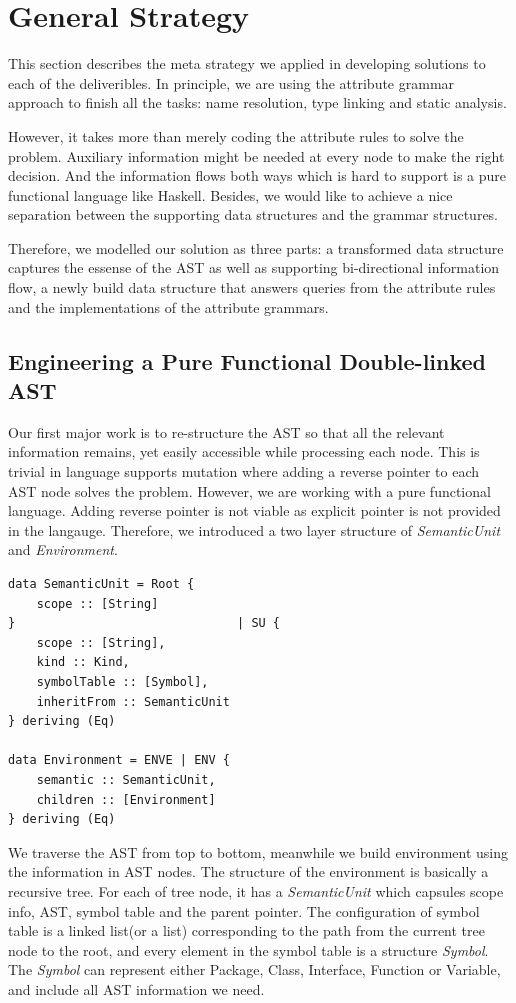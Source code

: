 \documentclass[12pt,letterpaper]{article}
\begin{document}
\section{General Strategy}
This section describes the meta strategy we applied in developing solutions to each of the deliveribles. In principle, we are using the attribute grammar approach to finish all the tasks: name resolution, type linking and static analysis.

However, it takes more than merely coding the attribute rules to solve the problem. Auxiliary information might be needed at every node to make the right decision. And the information flows both ways which is hard to support is a pure functional language like Haskell. Besides, we would like to achieve a nice separation between the supporting data structures and the grammar structures.

Therefore, we modelled our solution as three parts: a transformed data structure captures the essense of the AST as well as supporting bi-directional information flow, a newly build data structure that answers queries from the attribute rules and the implementations of the attribute grammars.

\subsection{Engineering a Pure Functional Double-linked AST}
Our first major work is to re-structure the AST so that all the relevant information remains, yet easily accessible while processing each node. This is trivial in language supports mutation where adding a reverse pointer to each AST node solves the problem. However, we are working with a pure functional language. Adding reverse pointer is not viable as explicit pointer is not provided in the langauge. Therefore, we introduced a two layer structure of \emph{SemanticUnit} and \emph{Environment}.
\begin{lstlisting}
data SemanticUnit = Root {
    scope :: [String]
}                               | SU {
    scope :: [String],
    kind :: Kind,
    symbolTable :: [Symbol],
    inheritFrom :: SemanticUnit
} deriving (Eq)

data Environment = ENVE | ENV {
    semantic :: SemanticUnit,
    children :: [Environment]
} deriving (Eq)
\end{lstlisting}

We traverse the AST from top to bottom, meanwhile we build environment using the information in AST nodes.
The structure of the environment is basically a recursive tree.
For each of tree node, it has a \emph{SemanticUnit} which capsules scope info, AST, symbol table and the parent pointer.
The configuration of symbol table is a linked list(or a list) corresponding to the path from the current tree node to the root, and every element in the symbol table is a structure \emph{Symbol}.
The \emph{Symbol} can represent either Package, Class, Interface, Function or Variable, and include all AST information we need.
\end{document}
